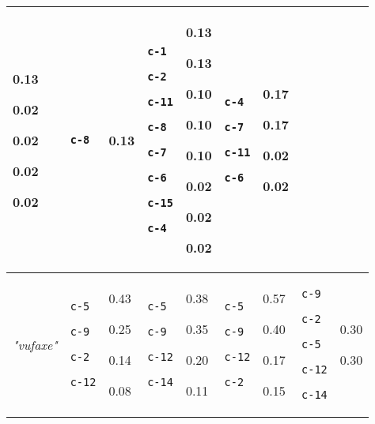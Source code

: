 {\begin{tabular}{@{}p{1.2cm}|p{1.3cm}@{}p{0.8cm}@{}|p{1.3cm}@{}p{0.8cm}@{}|p{1.3cm}@{}p{0.8cm}@{}|p{1.3cm}@{}p{0.8cm}@{}}
0.13

0.02

0.02

0.02

0.02 & \texttt{c-8} & 0.13 & \texttt{c-1}

\texttt{c-2}

\texttt{c-11}

\texttt{c-8}

\texttt{c-7}

\texttt{c-6}

\texttt{c-15}

\texttt{c-4} & 0.13

0.13

0.10

0.10

0.10

0.02

0.02

0.02 & \texttt{c-4}

\texttt{c-7}

\texttt{c-11}

\texttt{c-6} & 0.17

0.17

0.02

0.02\\
\hline
\textit{"vufaxe"} & \texttt{c-5}

\texttt{c-9}

\texttt{c-2}

\texttt{c-12} & 0.43

0.25

0.14

0.08 & \texttt{c-5}

\texttt{c-9}

\texttt{c-12}

\texttt{c-14} & 0.38

0.35

0.20

0.11 & \texttt{c-5}

\texttt{c-9}

\texttt{c-12}

\texttt{c-2} & 0.57

0.40

0.17

0.15 & \texttt{c-9}

\texttt{c-2}

\texttt{c-5}

\texttt{c-12}

\texttt{c-14} & 0.30

0.30


\end{tabular}}
